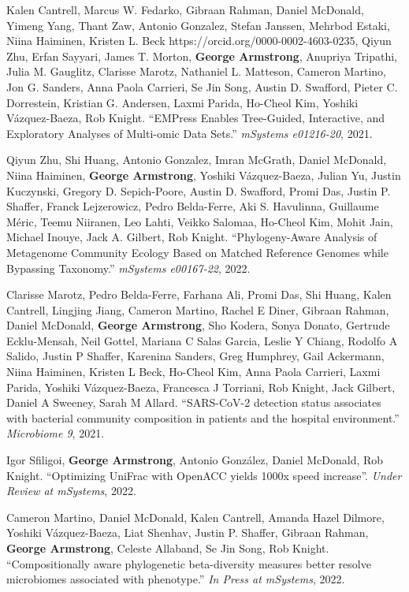 \begin{frontmatter}
\begin{vitapage}
\begin{publications}
    \item  Kalen Cantrell, Marcus W. Fedarko, Gibraan Rahman, Daniel McDonald, Yimeng Yang, Thant Zaw, Antonio Gonzalez, Stefan Janssen, Mehrbod Estaki, Niina Haiminen, Kristen L. Beck https://orcid.org/0000-0002-4603-0235, Qiyun Zhu, Erfan Sayyari, James T. Morton, \textbf{George Armstrong}, Anupriya Tripathi, Julia M. Gauglitz, Clarisse Marotz, Nathaniel L. Matteson, Cameron Martino, Jon G. Sanders, Anna Paola Carrieri, Se Jin Song, Austin D. Swafford, Pieter C. Dorrestein, Kristian G. Andersen, Laxmi Parida, Ho-Cheol Kim, Yoshiki Vázquez-Baeza, Rob Knight. ``EMPress Enables Tree-Guided, Interactive, and Exploratory Analyses of Multi-omic Data Sets.'' \textit{mSystems e01216-20}, 2021.
    
    \item Qiyun Zhu, Shi Huang, Antonio Gonzalez, Imran McGrath, Daniel McDonald, Niina Haiminen, \textbf{George Armstrong}, Yoshiki Vázquez-Baeza, Julian Yu, Justin Kuczynski, Gregory D. Sepich-Poore, Austin D. Swafford, Promi Das, Justin P. Shaffer, Franck Lejzerowicz, Pedro Belda-Ferre, Aki S. Havulinna, Guillaume Méric, Teemu Niiranen, Leo Lahti, Veikko Salomaa, Ho-Cheol Kim, Mohit Jain, Michael Inouye, Jack A. Gilbert, Rob Knight. ``Phylogeny-Aware Analysis of Metagenome Community Ecology Based on Matched Reference Genomes while Bypassing Taxonomy.'' \textit{mSystems e00167-22}, 2022.
    
    \item Clarisse Marotz, Pedro Belda-Ferre, Farhana Ali, Promi Das, Shi Huang, Kalen Cantrell, Lingjing Jiang, Cameron Martino, Rachel E Diner, Gibraan Rahman, Daniel McDonald, \textbf{George Armstrong}, Sho Kodera, Sonya Donato, Gertrude Ecklu-Mensah, Neil Gottel, Mariana C Salas Garcia, Leslie Y Chiang, Rodolfo A Salido, Justin P Shaffer, Karenina Sanders, Greg Humphrey, Gail Ackermann, Niina Haiminen, Kristen L Beck, Ho-Cheol Kim, Anna Paola Carrieri, Laxmi Parida, Yoshiki Vázquez-Baeza, Francesca J Torriani, Rob Knight, Jack Gilbert, Daniel A Sweeney, Sarah M Allard. ``SARS-CoV-2 detection status associates with bacterial community composition in patients and the hospital environment.'' \textit{Microbiome 9}, 2021.
    
    \item Igor Sfiligoi, \textbf{George Armstrong}, Antonio González, Daniel McDonald, Rob Knight. ``Optimizing UniFrac with OpenACC yields \>1000x speed increase''. \textit{Under Review at mSystems}, 2022.
    
    \item  Cameron Martino, Daniel McDonald, Kalen Cantrell, Amanda Hazel Dilmore, Yoshiki Vázquez-Baeza, Liat Shenhav, Justin P. Shaffer, Gibraan Rahman, \textbf{George Armstrong}, Celeste Allaband, Se Jin Song, Rob Knight. ``Compositionally aware phylogenetic beta-diversity measures better resolve microbiomes associated with phenotype.'' \textit{In Press at mSystems}, 2022.
    


\end{publications}
\end{vitapage}
\end{frontmatter}
